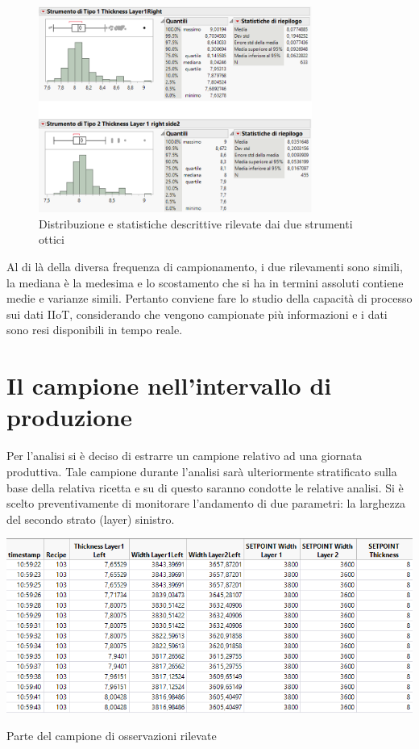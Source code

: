 \clearpage
\begin{figure}[h]
  \centering
  \includegraphics[width=0.8\textwidth]{img/stat-descr-ric37.png}
  \caption{Distribuzione e statistiche descrittive rilevate dai due strumenti ottici}
  \label{fig:stat-descr-ric37.png}
\end{figure}


Al di là della diversa frequenza di campionamento, i due rilevamenti sono simili, la mediana è la medesima e lo scostamento che si ha in termini assoluti contiene medie e varianze simili. 
Pertanto conviene fare lo studio della capacità di processo sui dati IIoT, considerando che vengono campionate più informazioni e i dati sono resi disponibili in tempo reale.


\label{Il campione nell'intervallo di produzione}
\section{Il campione nell'intervallo di produzione}

Per l'analisi si è deciso di estrarre un campione relativo ad una giornata produttiva.
Tale campione durante l'analisi sarà ulteriormente stratificato sulla base della relativa ricetta e su di questo saranno condotte le relative analisi.
Si è scelto preventivamente di monitorare l'andamento di due parametri: la larghezza del secondo strato (layer) sinistro.

\begin{table}[H]
  \centering
  \includegraphics[width=1\textwidth]{img/raw-dati.png}
  \caption{Parte del campione di osservazioni rilevate}
  \label{table:raw-dati.png}
\end{table}

